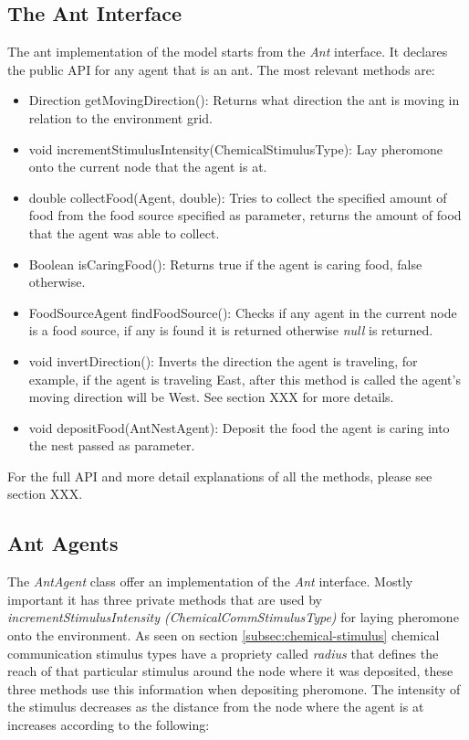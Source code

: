 \subsection{The Ant Interface}

The ant implementation of the model starts from the \emph{Ant} interface. It declares the public API for any agent that is an ant. The most relevant methods are: 

\begin{itemize}
  \item Direction getMovingDirection(): Returns what direction the ant is moving in relation to the environment grid.
  \item void incrementStimulusIntensity(ChemicalStimulusType): Lay pheromone onto the current node that the agent is at.
  \item double collectFood(Agent, double): Tries to collect the specified amount of food from the food source specified as parameter, returns the amount of food that the agent was able to collect.
  \item Boolean isCaringFood(): Returns true if the agent is caring food, false otherwise.
  \item FoodSourceAgent findFoodSource(): Checks if any agent in the current node is a food source, if any is found it is returned otherwise \emph{null} is returned.
  \item void invertDirection(): Inverts the direction the agent is traveling, for example, if the agent is traveling East, after this method is called the agent’s moving direction will be West. See section XXX for more details.
  \item void depositFood(AntNestAgent): Deposit the food the agent is caring into the nest passed as parameter.
\end{itemize}

For the full API and more detail explanations of all the methods, please see section XXX.

\subsection{Ant Agents}
\label{sec:pheromone-deposit}

The \emph{AntAgent} class offer an implementation of the \emph{Ant} interface. Mostly important it has three private methods that are used by \emph{incrementStimulusIntensity (ChemicalCommStimulusType)} for laying pheromone onto the environment. As seen on section \ref{subsec:chemical-stimulus} chemical communication stimulus types have a propriety called \emph{radius} that defines the reach of that particular stimulus around the node where it was deposited, these three methods use this information when depositing pheromone. The intensity of the stimulus decreases as the distance from the node where the agent is at increases according to the following: 

